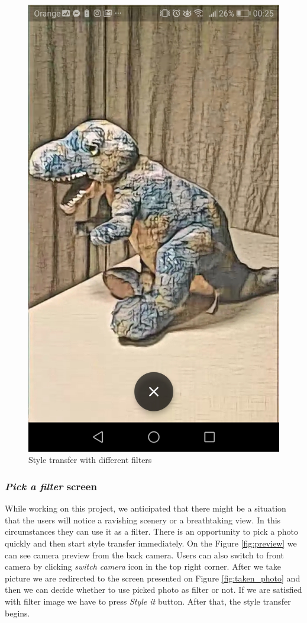 \documentclass[../Main.tex]{subfiles}
\begin{document}
\begin{figure}[H]
        \includegraphics[width=\linewidth]{Images/app_photos/dino/salon.jpg}
    \endminipage\hfill
    \caption{Style transfer with different filters}\label{fig:gallery_options}
\end{figure}


\subsubsection{\textit{Pick a filter} screen}
While working on this project, we anticipated that there might be a situation that the users will notice a ravishing 
scenery or a breathtaking view. In this circumstances they can use it as a filter.
There is an opportunity to pick a photo quickly and then start style transfer immediately.
On the Figure \ref{fig:preview} we can see camera preview from the back camera.
Users can also switch to front camera by clicking \textit{switch camera}
icon in the top right corner.
After we take picture we are redirected to the screen presented on Figure 
\ref{fig:taken_photo} and then we can decide whether to use picked photo as filter or not.
If we are satisfied with filter image we have to press \textit{Style it} button.
After that, the style transfer begins.
\end{document}
